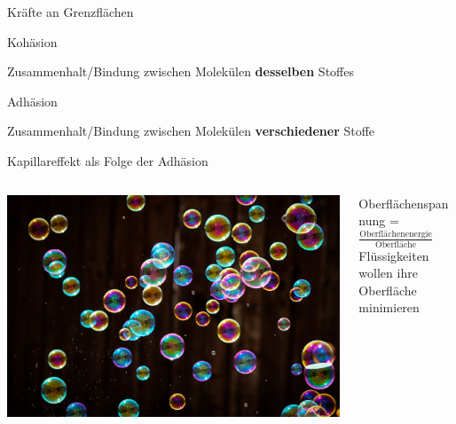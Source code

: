 \documentclass{beamer}
\begin{document}
\begin{frame}{Kräfte an Grenzflächen}

\begin{block}{Kohäsion}

Zusammenhalt/Bindung zwischen Molekülen \textbf{desselben} Stoffes

\end{block}

\begin{block}{Adhäsion}

Zusammenhalt/Bindung zwischen Molekülen \textbf{verschiedener} Stoffe

\end{block}

Kapillareffekt als Folge der Adhäsion \\[0.5 cm]

\pause

\begin{columns}[c]
\begin{column}{5cm}
\includegraphics[width=\textwidth]{seifenblasen.jpg}
\end{column}

\begin{column}{5cm}
Oberflächenspannung = $\frac{\text{Oberflächenenergie}}{\text{Oberfläche}}$ \\[0.5 cm]

Flüssigkeiten wollen ihre Oberfläche minimieren


\end{column}


\end{columns}

    
\end{frame}
\end{document}
